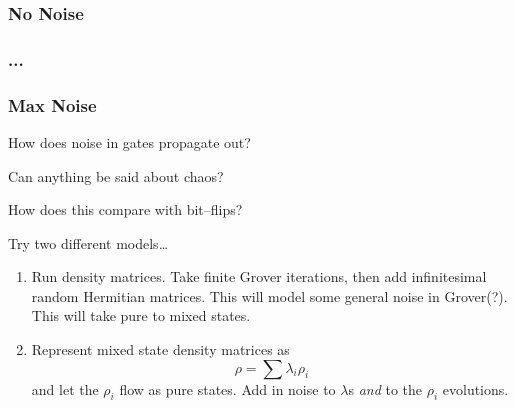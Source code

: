 \subsubsection{No Noise}
\subsubsection{...}
\subsubsection{Max Noise}


How does noise in gates propagate out?

Can anything be said about chaos?

How does this compare with bit--flips?

Try two different models\dots
\begin{enumerate}
\item Run density matrices.  Take finite Grover iterations, then add
infinitesimal random Hermitian matrices.  This will model some general
noise in Grover(?). This will take pure to mixed states.
\item Represent mixed state density matrices as
\begin{equation}
\rho = \sum\lambda_i\rho_i
\end{equation}
and let the $\rho_i$ flow as pure states.  Add in noise to $\lambda$s
{\sl and} to the $\rho_i$ evolutions.
\end{enumerate}

